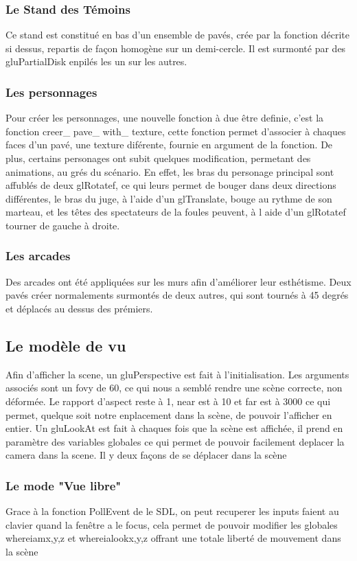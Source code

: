	\subsubsection{Le Stand des Témoins}
	Ce stand est constitué en bas d'un ensemble de pavés, crée par la fonction décrite si dessus, repartis de façon homogène sur un demi-cercle. Il est surmonté par des gluPartialDisk enpilés les un sur les autres.
	\subsubsection{Les personnages}
	Pour créer les personnages, une nouvelle fonction à due être definie, c'est la fonction creer\_ pave\_ with\_ texture, cette fonction permet d'associer à chaques faces d'un pavé, une texture diférente, fournie en argument de la fonction. De plus, certains personages ont subit quelques modification, permetant des animations, au grés du scénario.
	En effet, les bras du personage principal sont affublés de deux glRotatef, ce qui leurs permet de bouger dans deux directions différentes, le bras du juge, à l'aide d'un glTranslate, bouge au rythme de son marteau, et les têtes des spectateurs de la foules peuvent, à l aide d'un glRotatef tourner de gauche à droite.
	\subsubsection{Les arcades}
	Des arcades ont été appliquées sur les murs afin d'améliorer leur esthétisme. Deux pavés créer normalements surmontés de deux autres, qui sont tournés à 45 degrés et déplacés au dessus des prémiers.
\subsection{Le modèle de vu}
	Afin d'afficher la scene, un gluPerspective est fait à l'initialisation. Les arguments associés sont un fovy de 60, ce qui nous a semblé rendre une scène correcte, non déformée. Le rapport d'aspect reste à 1, near est à 10 et far est à 3000 ce qui permet, quelque soit notre enplacement dans la scène, de pouvoir l'afficher en entier.\newline
	Un gluLookAt est fait à chaques fois que la scène est affichée, il prend en paramètre des variables globales ce qui permet de pouvoir facilement deplacer la camera dans la scene. Il y deux façons de se déplacer dans la scène
	\subsubsection{Le mode "Vue libre"}
	Grace à la fonction PollEvent de le SDL, on peut recuperer les inputs faient au clavier quand la fenêtre a le focus, cela permet de pouvoir modifier les globales whereiam{x,y,z} et whereialook{x,y,z} offrant une totale liberté de mouvement dans la scène
